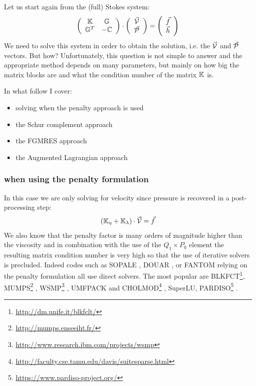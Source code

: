 
Let us start again from the (full) Stokes system:
\begin{equation}
\left(
\begin{array}{cc}
{\mathbb{K}} & {\mathbb{G}} \\ {\mathbb{G}}^T & -{\mathbb{C}} 
\end{array}
\right)
\cdot
\left(
\begin{array}{c}
\vec{\cal V} \\ \vec{\cal P}
\end{array}
\right)
=
\left(
\begin{array}{c}
\vec{f} \\ \vec{h}
\end{array}
\right)
\label{StokesSyst}
\end{equation}
We need to solve this system in order to obtain the solution, i.e. the $\vec{\cal V}$ 
and $\vec{\cal P}$ vectors. But how? 
Unfortunately, this question is not simple to answer and the appropriate method depends on many 
parameters, but mainly on how big the matrix blocks are and what the condition number of the matrix ${\mathbb{K}}$ is. 

In what follow I cover:
\begin{itemize}
\item solving when the penalty approach is used
\item the Schur complement approach
\item the FGMRES approach
\item the Augmented Lagrangian approach
\end{itemize}

\subsubsection{when using the penalty formulation}

In this case we are only solving for 
velocity since pressure is recovered in a post-processing step:
\[
({\mathbb{K}}_\eta+{\mathbb{K}}_\lambda) \cdot \vec {\cal V} = \vec f
\]
 We also know that 
the penalty factor is many orders of magnitude higher than the viscosity and 
in combination with the use of the $Q_1 \times P_0$ element the resulting matrix 
condition number is very high so that the use of iterative solvers is precluded. 
Indeed codes such as SOPALE \cite{full95}, DOUAR \cite{brtf08}, or FANTOM \cite{thie11} 
relying on the penalty formulation all use direct solvers.
The most popular are BLKFCT\footnote{\url{http://dm.unife.it/blkfclt/}}, 
MUMPS\footnote{\url{http://mumps.enseeiht.fr/}}
\cite{amdu89,amdl00,amdk01,amgl06}, 
WSMP\footnote{\url{http://www.research.ibm.com/projects/wsmp}} \cite{GUPTA94ieee,GUPTA09sc-long},
UMFPACK and CHOLMOD\footnote{\url{http://faculty.cse.tamu.edu/davis/suitesparse.html}}
, SuperLU, 
PARDISO\footnote{\url{https://www.pardiso-project.org/}}
\cite{pardiso-6.0a,pardiso-6.0b,pardiso-6.0c}.


